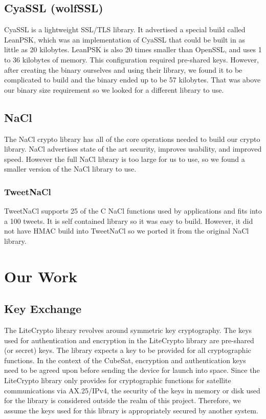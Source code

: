 \documentclass[12pt]{article}
\begin{document}
\begin{multicols}{2}
\subsection{CyaSSL (wolfSSL)}
CyaSSL is a lightweight SSL/TLS library. It advertised a special build called LeanPSK, which was an implementation of CyaSSL that could be built in as little as 20 kilobytes. LeanPSK is also 20 times smaller than OpenSSL, and uses 1 to 36 kilobytes of memory. This configuration required pre-shared keys. However, after creating the binary ourselves and using their library, we found it to be complicated to build and the binary ended up to be 57 kilobytes. That was above our binary size requirement so we looked for a different library to use. 
\subsection{NaCl}
The NaCl crypto library has all of the core operations needed to build our crypto library. NaCl advertises state of the art security, improves usability, and improved speed. However the full NaCl library is too large for us to use, so we found a smaller version of the NaCl library to use.
\subsubsection{TweetNaCl}
TweetNaCl supports 25 of the C NaCl functions used by applications and fits into a 100 tweets. It is self contained library so it was easy to build. However, it did not have HMAC build into TweetNaCl so we ported it from the original NaCl library.

\section{Our Work}
\subsection{Key Exchange}

The LiteCrypto library revolves around symmetric key cryptography. The keys used for authentication and encryption in the LiteCrypto library are pre-shared (or secret) keys. The library expects a key to be provided for all cryptographic functions. In the context of the CubeSat, encryption and authentication keys need to be agreed upon before sending the device for launch into space. Since the LiteCrypto library only provides for cryptographic functions for satellite communications via AX.25/IPv4, the security of the keys in memory or disk used for the library is considered outside the realm of this project. Therefore, we assume the keys used for this library is appropriately secured by another system.


\end{multicols}
\end{document}
